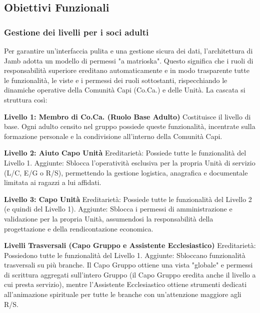 \documentclass[11pt]{article}
\numberwithin{figure}{section}
\begin{document}
\newpage

\subsection{Obiettivi Funzionali}
\subsubsection{Gestione dei livelli per i soci adulti}
Per garantire un'interfaccia pulita e una gestione sicura dei dati, l'architettura di Jamb adotta un modello di permessi "a matrioska". Questo significa che i ruoli di responsabilità superiore ereditano automaticamente e in modo trasparente tutte le funzionalità, le viste e i permessi dei ruoli sottostanti, rispecchiando le dinamiche operative della Comunità Capi (Co.Ca.) e delle Unità. La cascata si struttura così:

\textbf{Livello 1: Membro di Co.Ca. (Ruolo Base Adulto)} \newline
Costituisce il livello di base. Ogni adulto censito nel gruppo possiede queste funzionalità, incentrate sulla formazione personale e la condivisione all'interno della Comunità Capi.

\textbf{Livello 2: Aiuto Capo Unità} \newline
Ereditarietà: Possiede tutte le funzionalità del Livello 1.
Aggiunte: Sblocca l'operatività esclusiva per la propria Unità di servizio (L/C, E/G o R/S), permettendo la gestione logistica, anagrafica e documentale limitata ai ragazzi a lui affidati.

\textbf{Livello 3: Capo Unità} \newline
Ereditarietà: Possiede tutte le funzionalità del Livello 2 (e quindi del Livello 1).
Aggiunte: Sblocca i permessi di amministrazione e validazione per la propria Unità, assumendosi la responsabilità della progettazione e della rendicontazione economica.

\textbf{Livelli Trasversali (Capo Gruppo e Assistente Ecclesiastico)} \newline
Ereditarietà: Possiedono tutte le funzionalità del Livello 1.
Aggiunte: Sbloccano funzionalità trasversali su più branche. Il Capo Gruppo ottiene una vista "globale" e permessi di scrittura aggregati sull'intero Gruppo (il Capo Gruppo eredita anche il livello a cui presta servizio), mentre l'Assistente Ecclesiastico ottiene strumenti dedicati all'animazione spirituale per tutte le branche con un'attenzione maggiore agli R/S.
\end{document}
